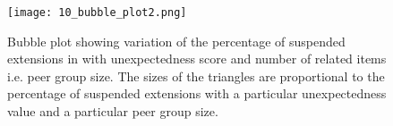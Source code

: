 \begin{figure}[!htbp]
\centering
\texttt{[image: 10\_bubble\_plot2.png]}
\caption{Bubble plot showing variation of the percentage of suspended extensions in \ChromeMarket{} 
with unexpectedness score and  number of related items i.e. peer group size. The sizes of the 
triangles are proportional to the percentage of suspended extensions with a particular unexpectedness 
value and a particular peer group size.}
\label{fig:bubble_plot_banned}
\end{figure}





























